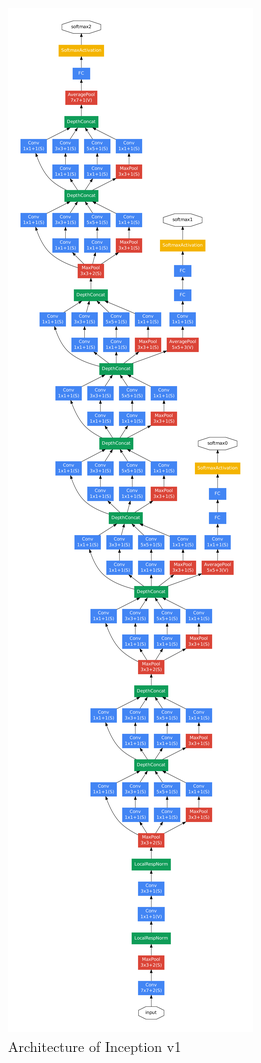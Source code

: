 \begin{figure}[H]
    \centering
    \includegraphics[angle=-90, width=0.85\linewidth]{./img/_inception_v1.pdf}
    \caption{Architecture of Inception v1}
\end{figure}


